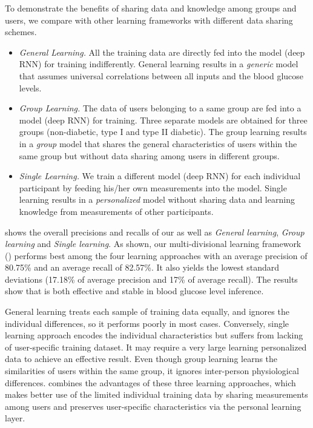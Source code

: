 To demonstrate the benefits of sharing data and knowledge among groups and users, we compare \modelname with other learning frameworks with different data sharing schemes.
\begin{itemize}
  \item \emph{General Learning.}
  All the training data are directly fed into the model (\ie deep RNN) for training indifferently.
  General learning results in a \emph{generic} model that assumes universal correlations between all inputs and the blood glucose levels.
  \item \emph{Group Learning.}
  The data of users belonging to a same group are fed into a model (\ie deep RNN) for training.
  Three separate models are obtained for three groups (\ie non-diabetic, type I and type II diabetic).
  The group learning results in a \emph{group} model that shares the general characteristics of users within the same group but without data sharing among users in different groups.
  \item \emph{Single Learning.}
  We train a different model (\ie deep RNN) for each individual participant by feeding his/her own measurements into the model.
  Single learning results in a \emph{personalized} model without sharing data and learning knowledge from measurements of other participants.
\end{itemize}

 shows the overall precisions and recalls of our \modelname as well as \emph{General learning}, \emph{Group learning} and \emph{Single learning}.
As shown, our multi-divisional learning framework (\modelname) performs best among the four learning approaches with an average precision of 80.75\% and an average recall of 82.57\%.
It also yields the lowest standard deviations (17.18\% of average precision and 17\% of average recall).
The results show that \modelname is both effective and stable in blood glucose level inference.

General learning treats each sample of training data equally, and ignores the individual differences, so it performs poorly in most cases.
\textcolor[rgb]{1.00,0.00,0.00}{Conversely, single learning approach encodes the individual characteristics but suffers from lacking of user-specific training dataset. It may require a very large learning personalized data to achieve an effective result.} Even though group learning learns the similarities of users within the same group, it ignores inter-person physiological differences.
\modelname combines the advantages of these three learning approaches, which makes better use of the limited individual training data by sharing measurements among users and preserves user-specific characteristics via the personal learning layer.

